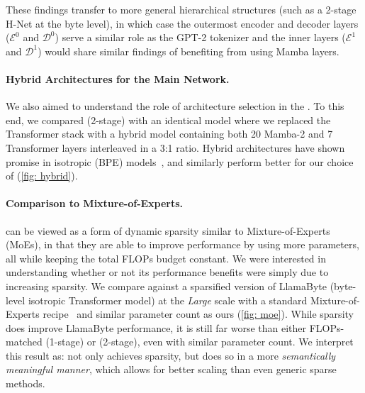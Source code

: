 These findings transfer to more general hierarchical structures (such as a 2-stage H-Net at the byte level),
in which case the outermost encoder and decoder layers ($\mathcal{E}^0$ and $\mathcal{D}^0$)
serve a similar role as the GPT-2 tokenizer and the inner layers ($\mathcal{E}^1$ and $\mathcal{D}^1$)
would share similar findings of benefiting from using Mamba layers.


\paragraph{Hybrid Architectures for the Main Network.}



We also aimed to understand the role of architecture selection in the \main{}.
To this end, we compared \model{} (2-stage) with an identical model where we replaced the Transformer stack with a hybrid model containing both 20 Mamba-2 and 7 Transformer layers interleaved in a 3:1 ratio.
Hybrid architectures have shown promise in isotropic (BPE) models~\citep{NvidiaMambaHybrid}, and similarly perform better for our choice of \main{} (\cref{fig: hybrid}).



\paragraph{Comparison to Mixture-of-Experts.}

\model{} can be viewed as a form of dynamic sparsity similar to Mixture-of-Experts (MoEs), in that they are able to improve performance by using more parameters, all while keeping the total FLOPs budget constant.
We were interested in understanding whether or not its performance benefits were simply due to increasing sparsity.
We compare against a sparsified version of LlamaByte (byte-level isotropic Transformer model) at the \textit{Large} scale with a standard Mixture-of-Experts recipe~\citep{MoE} and similar parameter count as ours (\cref{fig: moe}).
While sparsity does improve LlamaByte performance, it is still far worse than either FLOPs-matched \model{} (1-stage) or \model{} (2-stage), even with similar parameter count.
We interpret this result as: \model{} not only achieves sparsity, but does so in a more \textit{semantically meaningful manner}, which allows for better scaling than even generic sparse methods.


